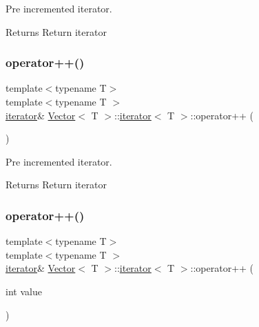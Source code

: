 Pre incremented iterator. 

\begin{DoxyReturn}{Returns}
Return iterator 
\end{DoxyReturn}
\mbox{\label{classVector_1_1iterator_a2e6098221d0a8b40c753819138a2d710}} 
\subsubsection{\texorpdfstring{operator++()}{operator++()}\hspace{0.1cm}{\footnotesize\ttfamily [2/4]}}
{\footnotesize\ttfamily template$<$typename T$>$ \\
template$<$typename T $>$ \\
\hyperlink{classVector_1_1iterator}{iterator}\& \hyperlink{classVector}{Vector}$<$ T $>$\+::\hyperlink{classVector_1_1iterator}{iterator}$<$ T $>$\+::operator++ (\begin{DoxyParamCaption}{ }\end{DoxyParamCaption})\hspace{0.3cm}{\ttfamily [inline]}}



Pre incremented iterator. 

\begin{DoxyReturn}{Returns}
Return iterator 
\end{DoxyReturn}
\mbox{\label{classVector_1_1iterator_a8e9cf2d45f325d1ed8979706ca97f498}} 
\subsubsection{\texorpdfstring{operator++()}{operator++()}\hspace{0.1cm}{\footnotesize\ttfamily [3/4]}}
{\footnotesize\ttfamily template$<$typename T$>$ \\
template$<$typename T $>$ \\
\hyperlink{classVector_1_1iterator}{iterator}\& \hyperlink{classVector}{Vector}$<$ T $>$\+::\hyperlink{classVector_1_1iterator}{iterator}$<$ T $>$\+::operator++ (\begin{DoxyParamCaption}\item[{int}]{value }\end{DoxyParamCaption})\hspace{0.3cm}{\ttfamily [inline]}}




